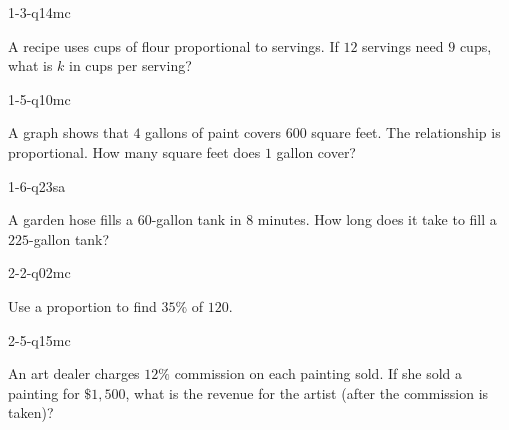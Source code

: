 
\begin{practiceQuestion}{1-3-q14}{mc}
\begin{questionText}
A recipe uses cups of flour proportional to servings. If $12$ servings need $9$ cups, what is $k$ in cups per serving?
\end{questionText}
\end{practiceQuestion}

\begin{practiceQuestion}{1-5-q10}{mc}
\begin{questionText}
A graph shows that $4$ gallons of paint covers $600$ square feet. The relationship is proportional. How many square feet does $1$ gallon cover?
\end{questionText}
\end{practiceQuestion}

\begin{practiceQuestion}{1-6-q23}{sa}
\begin{questionText}
A garden hose fills a $60$-gallon tank in $8$ minutes. How long does it take to fill a $225$-gallon tank?
\end{questionText}
\end{practiceQuestion}

\begin{practiceQuestion}{2-2-q02}{mc}
\begin{questionText}
Use a proportion to find $35\%$ of $120$.
\end{questionText}
\end{practiceQuestion}

\begin{practiceQuestion}{2-5-q15}{mc}
\begin{questionText}
An art dealer charges $12\%$ commission on each painting sold. If she sold a painting for $\$1{,}500$, what is the revenue for the artist (after the commission is taken)?
\end{questionText}
\end{practiceQuestion}

